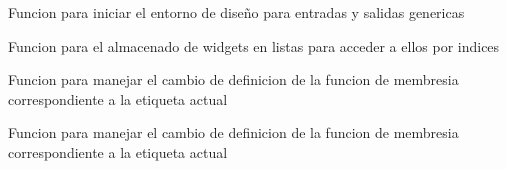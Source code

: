 \documentclass[letterpaper,10pt,spanish]{sphinxmanual}
\begin{document}

\begin{fulllineitems}
\label{\detokenize{codigos/FuzzyHandler:FuzzyHandler.crear_tabs}}
Funcion para iniciar el entorno de diseño para entradas y salidas genericas

\end{fulllineitems}


\begin{fulllineitems}
\label{\detokenize{codigos/FuzzyHandler:FuzzyHandler.crear_vectores_de_widgets}}
Funcion para el almacenado de widgets en listas para acceder a ellos por indices

\end{fulllineitems}


\begin{fulllineitems}
\label{\detokenize{codigos/FuzzyHandler:FuzzyHandler.definicion_in}}
Funcion para manejar el cambio de definicion de la funcion de membresia correspondiente a la etiqueta actual

\end{fulllineitems}


\begin{fulllineitems}
\label{\detokenize{codigos/FuzzyHandler:FuzzyHandler.definicion_out}}
Funcion para manejar el cambio de definicion de la funcion de membresia correspondiente a la etiqueta actual

\end{fulllineitems}
\end{document}
